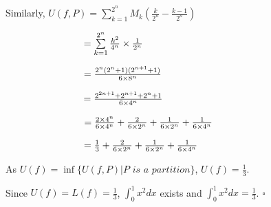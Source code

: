 \documentclass{article}
\begin{document}
\begin{enumerate}
    Similarly, $U(f, P) = \sum\limits_{k=1}^{2^n} M_k(\frac{k}{2^n} - \frac{k-1}{2^n}) $

    $\hspace{2.85cm}= \sum\limits_{k=1}^{2^n} \frac{k^2}{4^n} \times \frac{1}{2^n}$

    $\hspace{2.85cm}= \frac{2^n(2^n+1)(2^{n+1}+1)}{6\times8^n}$

    $ \hspace{2.85cm}= \frac{2^{2n+1} +2^{n+1} + 2^n +1}{6\times4^n} $

    $\hspace{2.85cm}= \frac{2\times4^n}{6\times4^n} + \frac{2}{6\times2^n} + \frac{1}{6\times2^n} + \frac{1}{6\times 4^n} $

    $\hspace{2.85cm}= \frac{1}{3} + \frac{2}{6\times2^n} + \frac{1}{6\times2^n} + \frac{1}{6\times 4^n}$

    As $U(f) = \inf \{ U(f, P) | P \textit{ is a partition}\}$, $U(f) = \frac{1}{3}$.

    Since $U(f) = L(f) = \frac{1}{3}$, $\int_{0}^1 x^2 \textit{dx}$ exists and $\int_{0}^1 x^2 \textit{dx} = \frac{1}{3}$. $\square$
\end{enumerate}
\end{document}

